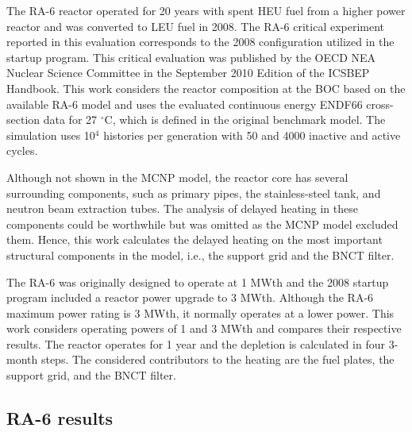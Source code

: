 The RA-6 reactor operated for 20 years with spent \gls*{HEU} fuel from a higher power reactor and was converted to \gls*{LEU} fuel in 2008.
The RA-6 critical experiment reported in this evaluation corresponds to the 2008 configuration utilized in the startup program.
This critical evaluation was published by the OECD NEA Nuclear Science Committee in the September 2010 Edition of the ICSBEP Handbook.
This work considers the reactor composition at the \gls*{BOC} based on the available RA-6 model and uses the evaluated continuous energy ENDF66 cross-section data for 27 $^{\circ}$C, which is defined in the original benchmark model.
The simulation uses 10$^4$ histories per generation with 50 and 4000 inactive and active cycles.

Although not shown in the MCNP model, the reactor core has several surrounding components, such as primary pipes, the stainless-steel tank, and neutron beam extraction tubes.
The analysis of delayed heating in these components could be worthwhile but was omitted as the MCNP model excluded them.
Hence, this work calculates the delayed heating on the most important structural components in the model, i.e., the support grid and the BNCT filter.

The RA-6 was originally designed to operate at 1 MWth and the 2008 startup program included a reactor power upgrade to 3 MWth.
Although the RA-6 maximum power rating is 3 MWth, it normally operates at a lower power.
This work considers operating powers of 1 and 3 MWth and compares their respective results.
The reactor operates for 1 year and the depletion is calculated in four 3-month steps.
The considered contributors to the heating are the fuel plates, the support grid, and the BNCT filter.


\subsection{RA-6 results}

